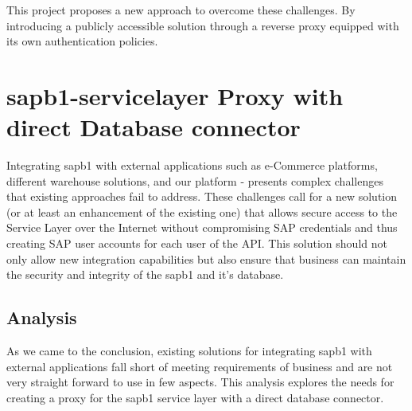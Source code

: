 This project proposes a new approach to overcome these challenges.
By introducing a publicly accessible solution through a reverse proxy equipped with its own authentication policies.

\section{\gls{sapb1-servicelayer} Proxy with direct Database connector}
\label{sec:sap-b1-service-layer-proxy}
Integrating \gls{sapb1} with external applications such as e-Commerce platforms, different warehouse solutions, and our platform - presents complex challenges that existing  approaches fail to address. 
These challenges call for a new solution (or at least an enhancement of the existing one) that allows secure access to the Service Layer over the Internet without compromising SAP credentials and thus creating SAP user accounts for each user of the API.
This solution should not only allow new integration capabilities but also ensure that business can maintain the security and integrity of the \gls{sapb1} and it's database.

\subsection{Analysis}
\label{subsec:analysis}
As we came to the conclusion, existing solutions for integrating \gls{sapb1} with external applications fall short of meeting requirements of business and are not very straight forward to use in few aspects.
This analysis explores the needs for creating a proxy for the \gls{sapb1} service layer with a direct database connector.

